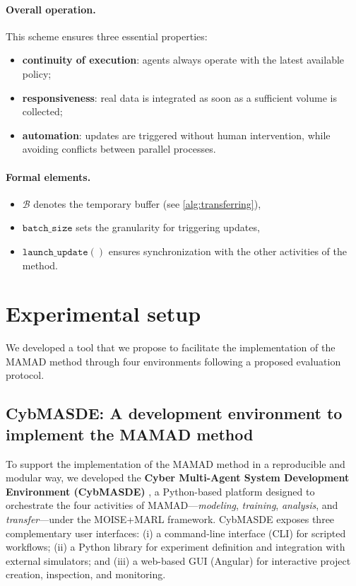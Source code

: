 \documentclass[pdflatex,sn-mathphys-num]{sn-jnl}%
\theoremstyle{thmstyleone}%
\theoremstyle{thmstyletwo}%
\theoremstyle{thmstylethree}%
\begin{document}
\paragraph*{Overall operation.}
This scheme ensures three essential properties:
\begin{itemize}
    \item \textbf{continuity of execution}: agents always operate with the latest available policy;
    \item \textbf{responsiveness}: real data is integrated as soon as a sufficient volume is collected;
    \item \textbf{automation}: updates are triggered without human intervention, while avoiding conflicts between parallel processes.
\end{itemize}

\paragraph*{Formal elements.}
%
\begin{itemize}
\item $\mathcal{B}$ denotes the temporary buffer (see \autoref{alg:transferring}),
\item $\texttt{batch\_size}$ sets the granularity for triggering updates,
\item $\texttt{launch\_update}()$ ensures synchronization with the other activities of the method.
\end {itemize}



\section{Experimental setup}
\label{sec:experimental_setup}

We developed a tool that we propose to facilitate the implementation of the MAMAD method through four environments following a proposed evaluation protocol.

\subsection{CybMASDE: A development environment to implement the MAMAD method}
\label{sec:cybmasde}

To support the implementation of the MAMAD method in a reproducible and modular way, 
we developed the \textbf{Cyber Multi-Agent System Development Environment (CybMASDE)}%
\footnotemark[1], a Python-based platform designed to orchestrate the four activities of 
MAMAD---\emph{modeling}, \emph{training}, \emph{analysis}, and \emph{transfer}---under the 
MOISE+MARL framework. CybMASDE exposes three complementary user interfaces: 
(i) a command-line interface (CLI) for scripted workflows; 
(ii) a Python library for experiment definition and integration with external simulators; and 
(iii) a web-based GUI (Angular) for interactive project creation, inspection, and monitoring.
\end{document}
